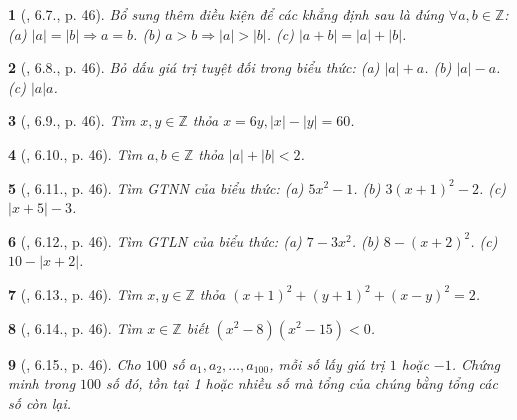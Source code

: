 \documentclass{article}
\newtheorem{baitoan}{}
\begin{document}
\begin{baitoan}[\cite{TLCT_THCS_Toan_6_so_hoc}, 6.7., p. 46]
	Bổ sung thêm điều kiện để các khẳng định sau là đúng $\forall a,b\in\mathbb{Z}$: (a) $|a| = |b|\Rightarrow a = b$. (b) $a > b\Rightarrow|a| > |b|$. (c) $|a + b| = |a| + |b|$.
\end{baitoan}

\begin{baitoan}[\cite{TLCT_THCS_Toan_6_so_hoc}, 6.8., p. 46]
	Bỏ dấu giá trị tuyệt đối trong biểu thức: (a) $|a| + a$. (b) $|a| - a$. (c) $|a|a$.
\end{baitoan}

\begin{baitoan}[\cite{TLCT_THCS_Toan_6_so_hoc}, 6.9., p. 46]
	Tìm $x,y\in\mathbb{Z}$ thỏa $x = 6y,|x| - |y| = 60$.
\end{baitoan}

\begin{baitoan}[\cite{TLCT_THCS_Toan_6_so_hoc}, 6.10., p. 46]
	Tìm $a,b\in\mathbb{Z}$ thỏa $|a| + |b| < 2$.
\end{baitoan}

\begin{baitoan}[\cite{TLCT_THCS_Toan_6_so_hoc}, 6.11., p. 46]
	Tìm {\rm GTNN} của biểu thức: (a) $5x^2 - 1$. (b) $3(x + 1)^2 - 2$. (c) $|x + 5| - 3$.
\end{baitoan}

\begin{baitoan}[\cite{TLCT_THCS_Toan_6_so_hoc}, 6.12., p. 46]
	Tìm {\rm GTLN} của biểu thức: (a) $7 - 3x^2$. (b) $8 - (x + 2)^2$. (c) $10 - |x + 2|$.
\end{baitoan}

\begin{baitoan}[\cite{TLCT_THCS_Toan_6_so_hoc}, 6.13., p. 46]
	Tìm $x,y\in\mathbb{Z}$ thỏa $(x + 1)^2 + (y + 1)^2 + (x - y)^2 = 2$.
\end{baitoan}

\begin{baitoan}[\cite{TLCT_THCS_Toan_6_so_hoc}, 6.14., p. 46]
	Tìm $x\in\mathbb{Z}$ biết $(x^2 - 8)(x^2 - 15) < 0$.
\end{baitoan}

\begin{baitoan}[\cite{TLCT_THCS_Toan_6_so_hoc}, 6.15., p. 46]
	Cho $100$ số $a_1,a_2,\ldots,a_{100}$, mỗi số lấy giá trị $1$ hoặc $-1$. Chứng minh trong $100$ số đó, tồn tại 1 hoặc nhiều số mà tổng của chúng bằng tổng các số còn lại.
\end{baitoan}
\end{document}
